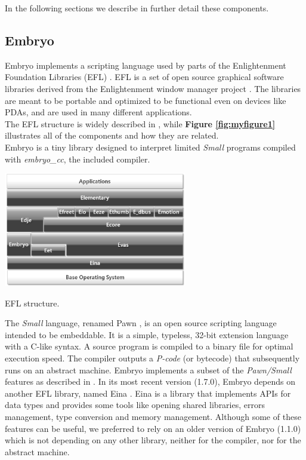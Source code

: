 \documentclass[a4paper,10pt]{article}
\makeatletter
\newenvironment{figurehere}{\def\@captype{figure}\vspace{2ex}}{\vspace{2ex}}
\makeatother
\begin{document}
\begin{multicols}{2}
In the following sections we describe in further detail these components.


\subsection{Embryo}

Embryo implements a scripting language used by parts of the Enlightenment Foundation Libraries (EFL) \cite{wikiEFL}. EFL is a set of open source graphical software libraries derived from the Enlightenment window manager project \cite{wikiEnlight}. The libraries are meant to be portable and optimized to be functional even on devices like PDAs, and are used in many different applications.\\
The EFL structure is widely described in \cite{enlightSite}, while {\bf Figure \ref{fig:myfigure1}} illustrates all of the components and how they are related.\\
Embryo \cite{embryoSite} is a tiny library designed to interpret limited \textit{Small} programs compiled with \textit{embryo\_cc}, the included compiler.

\begin{figurehere}
 \centering
 \includegraphics[width=8cm, height=5cm]{./eps/efl}
 \caption{EFL structure.}
 \label{fig:myfigure1}
\end{figurehere}

The \textit{Small} language, renamed Pawn \cite{pawnLang}, is an open source scripting language intended to be embeddable. It is a simple, typeless, 32-bit extension language with a C-like syntax. A source program is compiled to a binary file for optimal execution speed. The compiler outputs a \textit{P-code} (or bytecode) that subsequently runs on an abstract machine.\newline
Embryo implements a subset of the \textit{Pawn/Small} features as described in \cite{embyoLang}. In its most recent version (1.7.0), Embryo depends on another EFL library, named Eina \cite{einaLib}. Eina is a library that implements APIs for data types and provides some tools like opening shared libraries, errors management, type conversion and memory management. Although some of these features can be useful, we preferred to rely on an older version of Embryo (1.1.0) which is not depending on any other library, neither for the compiler, nor for the abstract machine.


\end{multicols}
\end{document}
